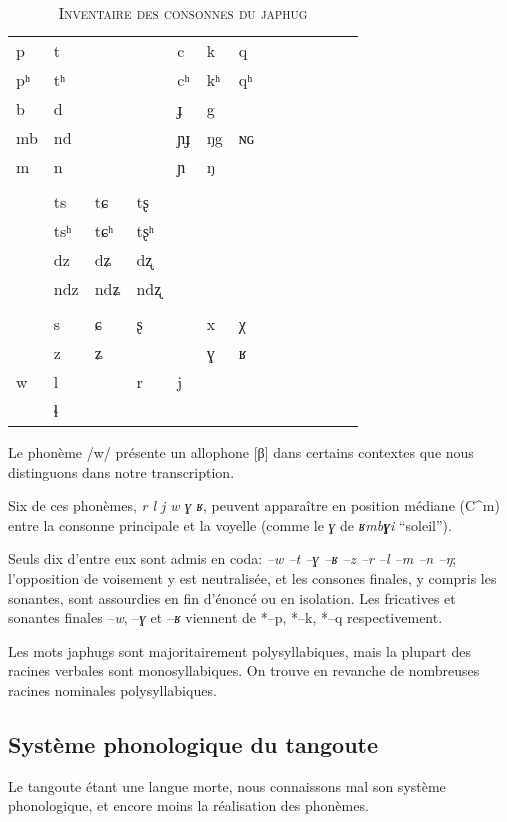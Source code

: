 \documentclass[oldfontcommands,twoside,a4paper,11pt,draft]{memoir}
\newcommand{\captionb}[1]{\caption{\textsc{#1}}}
\begin{document}
\begin{table}
\captionb{Inventaire des consonnes du japhug}\label{tab:inventaire-jpg}
\begin{tabular}{lllllllllllll} 
p	&	t	&		&		&	c	&	k	&	q	\\
pʰ	&	tʰ	&		&		&	cʰ	&	kʰ	&	qʰ	\\
b	&	d	&		&		&	ɟ	&	g	&		\\
mb	&	nd	&		&		&	ɲɟ	&	ŋg	&	ɴɢ	\\
m	&	n	&		&		&	ɲ	&	ŋ	&		\\
	&		&		&		&		&		&		\\
	&	ts	&	tɕ	&	tʂ	&		&		&		\\
	&	tsʰ	&	tɕʰ	&	tʂʰ	&		&		&		\\
	&	dz	&	dʑ	&	dʐ	&		&		&		\\
	&	ndz	&	ndʑ	&	ndʐ	&		&		&		\\
	&		&		&		&		&		&		\\
	&	s	&	ɕ	&	ʂ	&		&	x	&	χ	\\
	&	z	&	ʑ	&		&		&	ɣ	&	ʁ	\\
w	&	l	&		&	r	&	j	&		&		\\
	&	ɬ	&		&		&		&		&		\\
\end{tabular}
\end{table}
Le phonème /w/ présente un allophone [β] dans certains contextes que nous distinguons dans notre transcription.

Six de ces phonèmes, \textit{r l j w ɣ ʁ}, peuvent apparaître en position médiane (C^m) entre la consonne principale et la voyelle (comme le \textit{ɣ} de \textit{ʁmb\textbf{ɣ}i} ``soleil''). 

Seuls dix d'entre eux sont admis en coda: \textit{--w --t --ɣ --ʁ --z --r --l --m --n --ŋ}; l'opposition de voisement y est neutralisée, et les consones finales, y compris les sonantes, sont assourdies en fin d'énoncé ou en isolation.  Les fricatives et sonantes finales --\textit{w}, --\textit{ɣ} et --\textit{ʁ} viennent de *--p, *--k, *--q respectivement.

Les mots japhugs sont majoritairement polysyllabiques, mais la plupart des racines verbales sont monosyllabiques. On trouve en revanche de nombreuses racines nominales polysyllabiques.

\subsection{Système phonologique du tangoute}
Le tangoute étant une langue morte, nous connaissons mal son système phonologique, et encore moins la réalisation des phonèmes.
\end{document}
